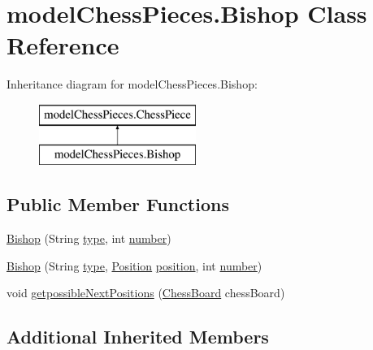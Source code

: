 \hypertarget{classmodel_chess_pieces_1_1_bishop}{\section{model\+Chess\+Pieces.\+Bishop Class Reference}
\label{classmodel_chess_pieces_1_1_bishop}
}
Inheritance diagram for model\+Chess\+Pieces.\+Bishop\+:\begin{figure}[H]
\begin{center}
\leavevmode
\includegraphics[height=2.000000cm]{classmodel_chess_pieces_1_1_bishop}
\end{center}
\end{figure}
\subsection*{Public Member Functions}
\begin{DoxyCompactItemize}
\item 
\hyperlink{classmodel_chess_pieces_1_1_bishop_ae2d6a71368f3304f8191acdf20949dc0}{Bishop} (String \hyperlink{classmodel_chess_pieces_1_1_chess_piece_a195487ca88c197af7c1604247be31db2}{type}, int \hyperlink{classmodel_chess_pieces_1_1_chess_piece_a979e63b99128333883acedc38d25dc87}{number})
\item 
\hyperlink{classmodel_chess_pieces_1_1_bishop_a224d00fc7396150863db9df71428a63c}{Bishop} (String \hyperlink{classmodel_chess_pieces_1_1_chess_piece_a195487ca88c197af7c1604247be31db2}{type}, \hyperlink{classmodel_core_1_1_position}{Position} \hyperlink{classmodel_chess_pieces_1_1_chess_piece_a3d4362d5b28f6edb14161196d9c6807d}{position}, int \hyperlink{classmodel_chess_pieces_1_1_chess_piece_a979e63b99128333883acedc38d25dc87}{number})
\item 
void \hyperlink{classmodel_chess_pieces_1_1_bishop_a55852b1b208028a1f87fbe46a1bf9337}{getpossible\+Next\+Positions} (\hyperlink{classmodel_core_1_1_chess_board}{Chess\+Board} chess\+Board)
\end{DoxyCompactItemize}
\subsection*{Additional Inherited Members}


